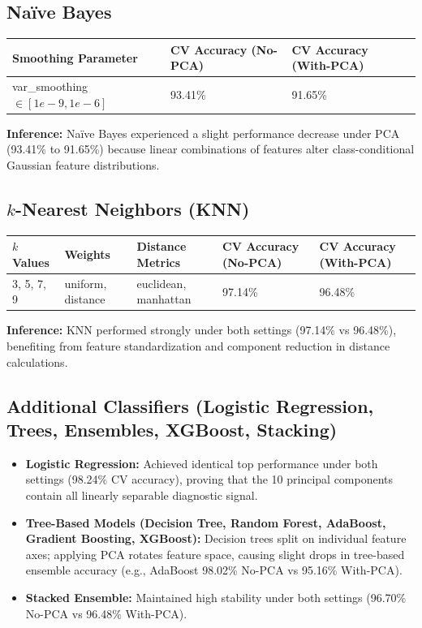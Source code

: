 \documentclass[12pt,a4paper]{article}
\begin{document}
\subsection*{Na\"ive Bayes}
\begin{longtable}{|p{4.5cm}|p{4.5cm}|p{4.5cm}|}
\hline
\textbf{Smoothing Parameter} & \textbf{CV Accuracy (No-PCA)} & \textbf{CV Accuracy (With-PCA)} \\ \hline
\endhead
var\_smoothing $\in [1e-9, 1e-6]$ & 93.41\% & 91.65\% \\ \hline
\end{longtable}
\textbf{Inference:} Na\"ive Bayes experienced a slight performance decrease under PCA (93.41\% to 91.65\%) because linear combinations of features alter class-conditional Gaussian feature distributions.

\subsection*{$k$-Nearest Neighbors (KNN)}
\begin{longtable}{|p{2.5cm}|p{2.5cm}|p{3.2cm}|p{2.8cm}|p{2.8cm}|}
\hline
\textbf{$k$ Values} & \textbf{Weights} & \textbf{Distance Metrics} & \textbf{CV Accuracy (No-PCA)} & \textbf{CV Accuracy (With-PCA)} \\ \hline
\endhead
3, 5, 7, 9 & uniform, distance & euclidean, manhattan & 97.14\% & 96.48\% \\ \hline
\end{longtable}
\textbf{Inference:} KNN performed strongly under both settings (97.14\% vs 96.48\%), benefiting from feature standardization and component reduction in distance calculations.

\subsection*{Additional Classifiers (Logistic Regression, Trees, Ensembles, XGBoost, Stacking)}
\begin{itemize}
\item \textbf{Logistic Regression:} Achieved identical top performance under both settings (98.24\% CV accuracy), proving that the 10 principal components contain all linearly separable diagnostic signal.
\item \textbf{Tree-Based Models (Decision Tree, Random Forest, AdaBoost, Gradient Boosting, XGBoost):} Decision trees split on individual feature axes; applying PCA rotates feature space, causing slight drops in tree-based ensemble accuracy (e.g., AdaBoost 98.02\% No-PCA vs 95.16\% With-PCA).
\item \textbf{Stacked Ensemble:} Maintained high stability under both settings (96.70\% No-PCA vs 96.48\% With-PCA).
\end{itemize}
\end{document}
